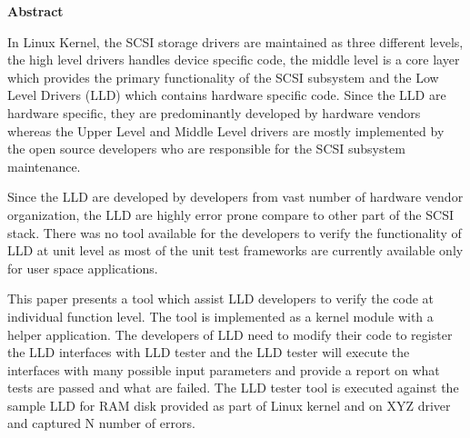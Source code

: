 \textbf{Abstract}\vspace{3 mm}

In Linux Kernel, the SCSI storage drivers are maintained as three different levels, the high level drivers handles device specific code, the middle level is a core layer which provides the primary functionality of the SCSI subsystem and the Low Level Drivers (LLD) which contains hardware specific code. Since the LLD are hardware specific, they are predominantly developed by hardware vendors whereas the Upper Level and Middle Level drivers are mostly implemented by the open source developers who are responsible for the SCSI subsystem maintenance.

Since the LLD are developed by developers from vast number of hardware vendor organization, the LLD are highly error prone compare to other part of the SCSI stack.  There was no tool available for the developers to verify the functionality of LLD at unit level as most of the unit test frameworks are currently available only for user space applications.  

This paper presents a tool which assist LLD developers to verify the code at individual function level.  The tool is implemented as a kernel module with a helper application. The developers of LLD need to modify their code to register the LLD interfaces with LLD tester and the LLD tester will execute the interfaces with many possible input parameters and provide a report on what tests are passed and what are failed.   The LLD tester tool is executed against the sample LLD for RAM disk provided as part of Linux kernel and on XYZ driver and captured N number of errors.


